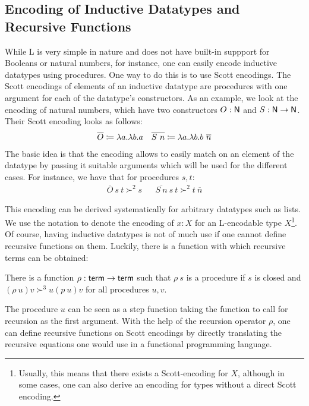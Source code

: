 \subsection{Encoding of Inductive Datatypes and Recursive Functions}
While L is very simple in nature and does not have built-in suppport for Booleans or natural numbers, for instance, one can easily encode inductive datatypes using procedures. One way to do this is to use Scott encodings. 
The Scott encodings of elements of an inductive datatype are procedures with one argument for each of the datatype's constructors. 
As an example, we look at the encoding of natural numbers, which have two constructors $O : \mathsf{N}$ and $S : \mathsf{N} \rightarrow \mathsf{N}$.
Their Scott encoding looks as follows: 
\begin{align*}
  \overline{O} \coloneqq \lambda a. \lambda b. a 
  && \overline{S~n} \coloneqq \lambda a. \lambda b. b~\overline{n}
\end{align*}
The basic idea is that the encoding allows to easily match on an element of the datatype by passing it suitable arguments which will be used for the different cases. 
For instance, we have that for procedures $s, t$: 
\begin{align*}
  \overline{O}~s~t \succ^2 s && \overline{S~n}~s~t \succ^2 t~\overline{n} 
\end{align*}

This encoding can be derived systematically for arbitrary datatypes such as lists. We use the notation  to denote the encoding of $x : X$ for an L-encodable type $X$\footnote{Usually, this means that there exists a Scott-encoding for $X$, although in some cases, one can also derive an encoding for types without a direct Scott encoding.}.
Of course, having inductive datatypes is not of much use if one cannot define recursive functions on them. 
Luckily, there is a function with which recursive terms can be obtained: 
\begin{fact}
  There is a function $\rho : \textsf{term} \rightarrow \textsf{term}$ such that $\rho~s$ is a procedure if $s$ is closed and $(\rho~u)v \succ^3 u(p~u)v$ for all procedures $u, v$.
\end{fact}
The procedure $u$ can be seen as a step function taking the function to call for recursion as the first argument. 
With the help of the recursion operator $\rho$, one can define recursive functions on Scott encodings by directly translating the recursive equations one would use in a functional programming language.

